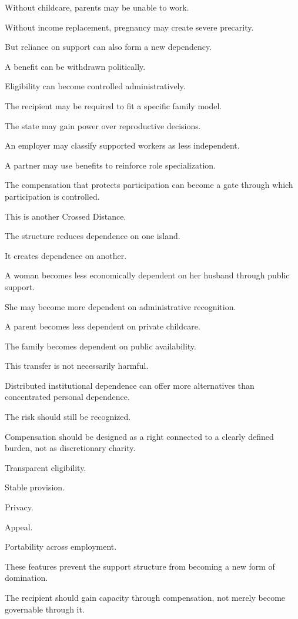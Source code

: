 Without childcare, parents may be unable to work.

Without income replacement, pregnancy may create severe precarity.

But reliance on support can also form a new dependency.

A benefit can be withdrawn politically.

Eligibility can become controlled administratively.

The recipient may be required to fit a specific family model.

The state may gain power over reproductive decisions.

An employer may classify supported workers as less independent.

A partner may use benefits to reinforce role specialization.

The compensation that protects participation can become a gate through which participation is controlled.

This is another Crossed Distance.

The structure reduces dependence on one island.

It creates dependence on another.

A woman becomes less economically dependent on her husband through public support.

She may become more dependent on administrative recognition.

A parent becomes less dependent on private childcare.

The family becomes dependent on public availability.

This transfer is not necessarily harmful.

Distributed institutional dependence can offer more alternatives than concentrated personal dependence.

The risk should still be recognized.

Compensation should be designed as a right connected to a clearly defined burden, not as discretionary charity.

Transparent eligibility.

Stable provision.

Privacy.

Appeal.

Portability across employment.

These features prevent the support structure from becoming a new form of domination.

The recipient should gain capacity through compensation, not merely become governable through it.

